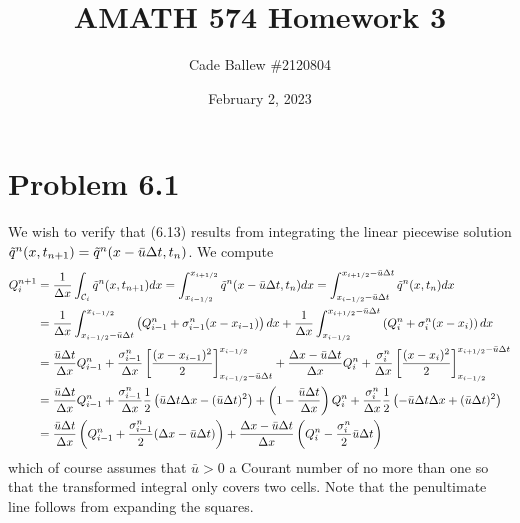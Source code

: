 \documentclass{article}
\title{AMATH 574 Homework 3}
\author{Cade Ballew \#2120804}
\date{February 2, 2023}
\begin{document}
	
\maketitle
	
\section{Problem 6.1}
We wish to verify that (6.13) results from integrating the linear piecewise solution $\Tilde q^n(x,t_{n+1})=\Tilde q^n(x-\bar u\Delta t,t_n)$. We compute
\begin{align*}
Q^{n+1}_i&=\frac{1}{\Delta x}\int_{\mathcal C_i}\Tilde q^n(x,t_{n+1})dx=\int_{x_{i-1/2}}^{x_{i+1/2}}\Tilde q^n(x-\bar u\Delta t,t_n)dx=\int_{x_{i-1/2}-\bar u\Delta t}^{x_{i+1/2}-\bar u\Delta t}\Tilde q^n(x,t_n)dx\\&=
\frac{1}{\Delta x}\int_{x_{i-1/2}-\bar u\Delta t}^{x_{i-1/2}} \left(Q_{i-1}^n+\sigma_{i-1}^n(x-x_{i-1})\right)dx+\frac{1}{\Delta x}\int_{x_{i-1/2}}^{x_{i+1/2}-\bar u\Delta t} \left(Q_{i}^n+\sigma_{i}^n(x-x_{i})\right)dx\\&=
\frac{\bar u\Delta t}{\Delta x}Q_{i-1}^n+\frac{\sigma_{i-1}^n}{\Delta x}\left[\frac{(x-x_{i-1})^2}{2}\right]_{x_{i-1/2}-\bar u\Delta t}^{x_{i-1/2}}+\frac{\Delta x-\bar u\Delta t}{\Delta x}Q^n_i+\frac{\sigma_{i}^n}{\Delta x}\left[\frac{(x-x_{i})^2}{2}\right]_{x_{i-1/2}}^{x_{i+1/2}-\bar u\Delta t}\\&=
\frac{\bar u\Delta t}{\Delta x}Q_{i-1}^n+\frac{\sigma_{i-1}^n}{\Delta x}\frac{1}{2}\left(\bar u\Delta t\Delta x-(\bar u\Delta t)^2\right)+\left(1-\frac{\bar u\Delta t}{\Delta x}\right)Q^n_i+\frac{\sigma_{i}^n}{\Delta x}\frac{1}{2}\left(-\bar u\Delta t\Delta x+(\bar u\Delta t)^2\right)\\&=
\frac{\bar u\Delta t}{\Delta x}\left(Q_{i-1}^n+\frac{\sigma_{i-1}^n}{2}(\Delta x-\bar u\Delta t)\right)+\frac{\Delta x-\bar u\Delta t}{\Delta x}\left(Q^n_i-\frac{\sigma_{i}^n}{2}\bar u\Delta t\right)
\end{align*}
which of course assumes that $\bar u>0$ a Courant number of no more than one so that the transformed integral only covers two cells. Note that the penultimate line follows from expanding the squares.
\end{document}
